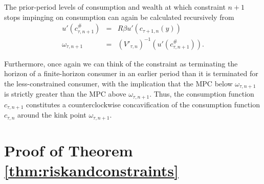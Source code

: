 \documentclass[titlepage]{\econtex}
\providecommand{\wAlt}{\omega}
\begin{document}
  The prior-period levels of consumption and wealth at which constraint $n+1$ stops impinging on consumption can again be calculated recursively from
  \begin{eqnarray*}
    u'(c_{\tau,n+1}^{\#}) & = & R\beta u'(c_{\tau+1,n}({y}))
    \\  \wAlt_{\tau,n+1} & = & \left(V'_{\tau,n}\right)^{-1}(u'(c_{\tau,n+1}^{\#})).
  \end{eqnarray*}

  Furthermore, once again we can think of the constraint as terminating
  the horizon of a finite-horizon consumer in an earlier period than it
  is terminated for the less-constrained consumer, with the implication
  that the MPC below $\wAlt_{\tau,n+1}$ is strictly greater than the MPC
  above $\wAlt_{\tau,n+1}$.  Thus, the consumption function $c_{\tau,n+1}$
  constitutes a counterclockwise concavification of the consumption
  function $c_{\tau,n}$ around the kink point $\wAlt_{\tau,n+1}$.


  \section{Proof of Theorem \ref{thm:riskandconstraints}}\label{app:riskandconstraints}
\end{document}
